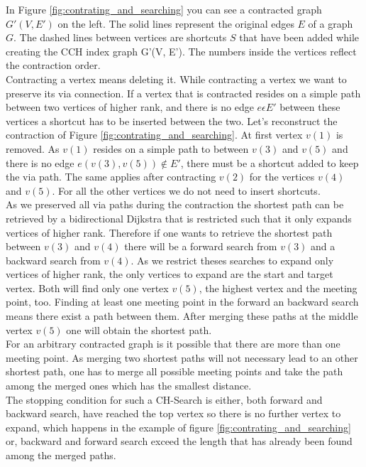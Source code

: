 In Figure \ref{fig:contrating_and_searching} you can see a contracted graph $G'(V,E')$ on the left. The solid lines represent the original edges $E$ of a graph $G$. The dashed lines between vertices are shortcuts $S$ that 
have been added while creating the CCH index graph G'(V, E'). The numbers inside the vertices reflect the contraction order.
\\
Contracting a vertex means deleting it. While contracting a vertex we want to preserve its via connection. If a vertex that is contracted resides on a simple path between two vertices of higher rank,
and there is no edge $e \epsilon E'$ between these vertices a shortcut has to be inserted between the two. 
Let's reconstruct the contraction of Figure \ref{fig:contrating_and_searching}. At first vertex $v(1)$ is removed. As $v(1)$ resides on a simple path to between $v(3)$ and $v(5)$ and there is no edge $e(v(3), v(5)) \notin E'$,
there must be a shortcut added to keep the via path.
The same applies after contracting $v(2)$ for the vertices $v(4)$ and $v(5)$. For all the other vertices we do not need to insert shortcuts.
\\
As we preserved all via paths during the contraction the shortest path can be retrieved by a bidirectional Dijkstra that is restricted such that it only expands vertices of higher rank. 
Therefore if one wants to retrieve the shortest path between $v(3)$ and $v(4)$ there will be a forward search from $v(3)$ and a backward search from $v(4)$. As we restrict theses searches to expand only vertices
of higher rank, the only vertices to expand are the start and target vertex. Both will find only one vertex $v(5)$, the highest vertex and the meeting point, too. Finding at least one meeting point in the forward an backward search means there exist a path between them.
After merging these paths at the middle vertex $v(5)$ one will obtain the shortest path.
\\
For an arbitrary contracted graph is it possible that there are more than one meeting point. As merging two shortest paths will not necessary lead to an other shortest path, one has to merge
all possible meeting points and take the path among the merged ones which has the smallest distance. 
\\ 
The stopping condition for such a CH-Search is either, both forward and backward search, have reached the top vertex so there is no further vertex to expand, which happens in the example of figure \ref{fig:contrating_and_searching} or, backward and forward search exceed 
the length that has already been found among the merged paths.

